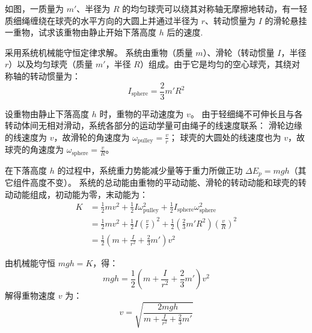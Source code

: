 \begin{exercise}\label{ex:6.4}
如图，一质量为 $m'$、半径为 $R$ 的均匀球壳可以绕其对称轴无摩擦地转动，有一轻质细绳缠绕在球壳的水平方向的大圆上并通过半径为 $r$、转动惯量为 $I$ 的滑轮悬挂一重物，试求该重物由静止开始下落高度 $h$ 后的速度.
\begin{center}
\end{center}
\end{exercise}
\begin{solution}
采用系统机械能守恒定律求解。
系统由重物（质量 $m$）、滑轮（转动惯量 $I$，半径 $r$）以及均匀球壳（质量 $m'$，半径 $R$）组成。由于它是均匀的空心球壳，其绕对称轴的转动惯量为：
$$ I_{\text{sphere}} = \frac{2}{3} m' R^2 $$

设重物由静止下落高度 $h$ 时，重物的平动速度为 $v$。
由于轻细绳不可伸长且与各转动体间无相对滑动，系统各部分的运动学量可由绳子的线速度联系：
滑轮边缘的线速度为 $v$，故滑轮的角速度为 $\omega_{\text{pulley}} = \frac{v}{r}$；
球壳的大圆处的线速度也为 $v$，故球壳的角速度为 $\omega_{\text{sphere}} = \frac{v}{R}$。

在下落高度 $h$ 的过程中，系统重力势能减少量等于重力所做正功 $\Delta E_p = m g h$（其它组件高度不变）。
系统的总动能由重物的平动动能、滑轮的转动动能和球壳的转动动能组成，初动能为零，末动能为：
\begin{align*}
    K &= \frac{1}{2} m v^2 + \frac{1}{2} I \omega_{\text{pulley}}^2 + \frac{1}{2} I_{\text{sphere}} \omega_{\text{sphere}}^2 \\
      &= \frac{1}{2} m v^2 + \frac{1}{2} I \left(\frac{v}{r}\right)^2 + \frac{1}{2} \left( \frac{2}{3} m' R^2 \right) \left(\frac{v}{R}\right)^2 \\
      &= \frac{1}{2} \left( m + \frac{I}{r^2} + \frac{2}{3} m' \right) v^2
\end{align*}

由机械能守恒 $mgh = K$，得：
$$ mgh = \frac{1}{2} \left( m + \frac{I}{r^2} + \frac{2}{3} m' \right) v^2 $$
解得重物速度 $v$ 为：
$$ v = \sqrt{ \frac{2mgh}{m + \frac{I}{r^2} + \frac{2}{3} m'} } $$
\end{solution}

